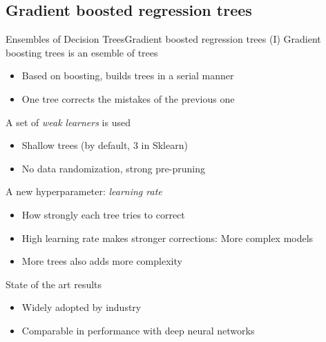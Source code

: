 \documentclass[10pt,compress]{beamer} %
\begin{document}
\subsection{Gradient boosted regression trees}
\begin{frame}{Ensembles of Decision Trees}{Gradient boosted regression trees (I)}
    \alert{Gradient boosting} trees is an esemble of trees 
    \begin{itemize}
        \item Based on boosting, builds trees in a serial manner
        \item One tree corrects the mistakes of the previous one
    \end{itemize}

    A set of \textit{weak learners} is used
    \begin{itemize}
        \item Shallow trees (by default, $3$ in Sklearn)
        \item No data randomization, strong pre-pruning
    \end{itemize}

    A new hyperparameter: \textit{learning rate}
    \begin{itemize}
        \item How strongly each tree tries to correct
        \item High learning rate makes stronger corrections: More complex models
        \item More trees also adds more complexity
    \end{itemize}

    State of the art results
    \begin{itemize}
        \item Widely adopted by industry
        \item Comparable in performance with deep neural networks
    \end{itemize}
\end{frame}
\end{document}
